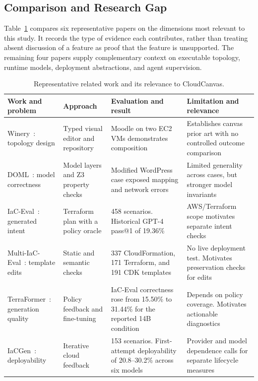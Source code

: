 \subsection{Comparison and Research Gap}
Table~\ref{tab:related} compares six representative papers on the dimensions most relevant to this study. It records the type of evidence each contributes, rather than treating absent discussion of a feature as proof that the feature is unsupported. The remaining four papers supply complementary context on executable topology, runtime models, deployment abstractions, and agent supervision.
\begin{table}[t]
\caption{Representative related work and its relevance to CloudCanvas.}
\label{tab:related}
\centering\footnotesize
\begin{tabularx}{\linewidth}{p{.17\linewidth}XXX}
\toprule
Work and problem & Approach & Evaluation and result & Limitation and relevance \\
\midrule
Winery~\cite{winery2013}: topology design & Typed visual editor and repository & Moodle on two EC2 VMs demonstrates composition & Establishes canvas prior art with no controlled outcome comparison \\
DOML~\cite{doml2024}: model correctness & Model layers and Z3 property checks & Modified WordPress case exposed mapping and network errors & Limited generality across cases, but stronger model invariants \\
IaC-Eval~\cite{iaceval2024}: generated intent & Terraform plan with a policy oracle & 458 scenarios. Historical GPT-4 pass@1 of 19.36\% & AWS/Terraform scope motivates separate intent checks \\
Multi-IaC-Eval~\cite{multi2025}: template edits & Static and semantic checks & 337 CloudFormation, 171 Terraform, and 191 CDK templates & No live deployment test. Motivates preservation checks for edits \\
TerraFormer~\cite{terraformer2026}: generation quality & Policy feedback and fine-tuning & IaC-Eval correctness rose from 15.50\% to 31.44\% for the reported 14B condition & Depends on policy coverage. Motivates actionable diagnostics \\
IaCGen~\cite{iacgen2026}: deployability & Iterative cloud feedback & 153 scenarios. First-attempt deployability of 20.8--30.2\% across six models & Provider and model dependence calls for separate lifecycle measures \\
\bottomrule
\end{tabularx}
\end{table}
